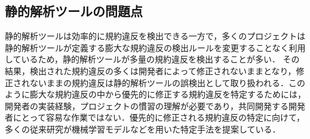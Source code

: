 \documentclass[T,J]{fose} %
\begin{document}



\subsection{静的解析ツールの問題点}

静的解析ツールは効率的に規約違反を検出できる一方で，多くのプロジェクトは静的解析ツールが定義する膨大な規約違反の検出ルールを変更することなく利用しているため，静的解析ツールが多量の規約違反を検出することが多い\cite{UsingStaticAnalysisTools2}．
その結果，検出された規約違反の多くは開発者によって修正されないままとなり，修正されないままの規約違反は静的解析ツールの誤検出として取り扱われる．このように膨大な規約違反の中から優先的に修正する規約違反を特定するためには，開発者の実装経験，プロジェクトの慣習の理解が必要であり，共同開発する開発者にとって容易な作業ではない\cite{shuseisarenai}．優先的に修正される規約違反の特定に向けて，多くの従来研究が機械学習モデルなどを用いた特定手法を提案している．
\end{document}
